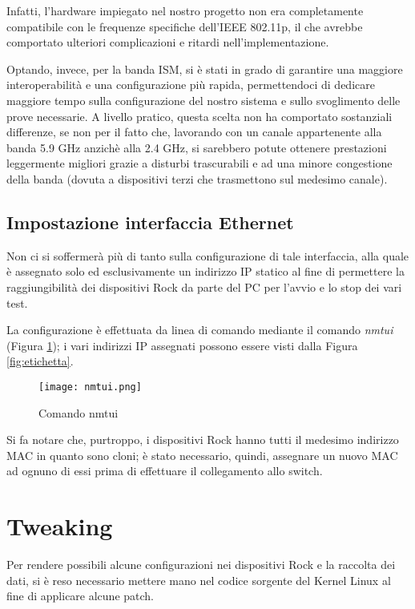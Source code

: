 Infatti, l'hardware impiegato nel nostro progetto non era completamente compatibile con le frequenze specifiche dell'IEEE 802.11p, il che avrebbe comportato ulteriori complicazioni e ritardi nell'implementazione.

Optando, invece, per la banda ISM, si è stati in grado di garantire una maggiore interoperabilità e una configurazione più rapida, permettendoci di dedicare maggiore tempo sulla configurazione del nostro sistema e sullo svoglimento delle prove necessarie. A livello pratico, questa scelta non ha comportato sostanziali differenze, se non per il fatto che, lavorando con un canale appartenente alla banda 5.9 GHz anzichè alla 2.4 GHz, si sarebbero potute ottenere prestazioni leggermente migliori grazie a disturbi trascurabili e ad una minore congestione della banda (dovuta a dispositivi terzi che trasmettono sul medesimo canale).

\subsection[Impostazione interfaccia Ethernet]{Impostazione interfaccia Ethernet}
Non ci si soffermerà più di tanto sulla configurazione di tale interfaccia, alla quale è assegnato solo ed esclusivamente un indirizzo IP statico al fine di permettere la raggiungibilità dei dispositivi Rock da parte del PC per l'avvio e lo stop dei vari test.

La configurazione è effettuata da linea di comando mediante il comando \textit{nmtui} (Figura \ref{fig:nmtui}); i vari indirizzi IP assegnati possono essere visti dalla Figura \ref{fig:etichetta}.

\begin{figure}[h!]
    \centering
    \texttt{[image: nmtui.png]}
    \caption{Comando nmtui}
    \label{fig:nmtui}
\end{figure}

Si fa notare che, purtroppo, i dispositivi Rock hanno tutti il medesimo indirizzo MAC in quanto sono cloni; è stato necessario, quindi, assegnare un nuovo MAC ad ognuno di essi prima di effettuare il collegamento allo switch.

\section{Tweaking}
Per rendere possibili alcune configurazioni nei dispositivi Rock e la raccolta dei dati, si è reso necessario mettere mano nel codice sorgente del Kernel Linux al fine di applicare alcune patch.

